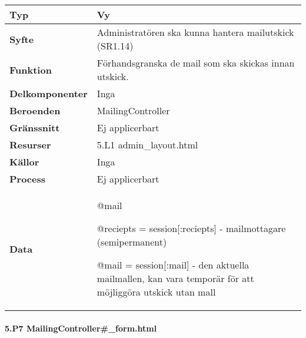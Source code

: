 \documentclass[a4paper, twoside, 11pt, titlepage]{article}
\begin{document}
			\begin {table} [ht] \begin{tabular} {  p{3.5cm} p{11.6cm} }
				\hline
				{\sffamily\textbf{Typ}} & {Vy} \\
				\hline
				{\sffamily\textbf{Syfte}} & {Administratören ska kunna hantera mailutskick (SR1.14)} \\
				\hline
				{\sffamily\textbf{Funktion}} & {Förhandsgranska de mail som ska skickas innan utskick.} \\
				\hline
				{\sffamily\textbf{Delkomponenter}} & {Inga} \\
				\hline
				{\sffamily\textbf{Beroenden}} & {MailingController} \\
				\hline
				{\sffamily\textbf{Gränssnitt}} & {Ej applicerbart} \\
				\hline
				{\sffamily\textbf{Resurser}} & {5.L1 admin\_layout.html} \\
				\hline
				{\sffamily\textbf{Källor}} & {Inga} \\
				\hline
				{\sffamily\textbf{Process}} & {Ej applicerbart} \\
				\hline
				{\sffamily\textbf{Data}} & {@mail

@reciepts = session[:reciepts] - mailmottagare (semipermanent)

@mail = session[:mail] - den aktuella mailmallen, kan vara temporär för att möjliggöra utskick utan mall} \\
				\hline
			\end{tabular} \end{table} \FloatBarrier


			\clearpage %
			\paragraph{5.P7 MailingController\#\_form.html}\
\end{document}
